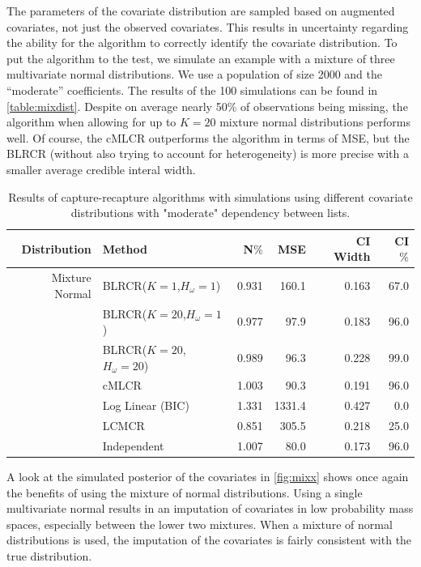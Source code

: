 \documentclass[
  12pt,
]{article}
\begin{document}
The parameters of the covariate distribution are sampled based on
augmented covariates, not just the observed covariates. This results in
uncertainty regarding the ability for the algorithm to correctly
identify the covariate distribution. To put the algorithm to the test,
we simulate an example with a mixture of three multivariate normal
distributions. We use a population of size 2000 and the ``moderate''
coefficients. The results of the 100 simulations can be found in
\autoref{table:mixdist}. Despite on average nearly 50\(\%\) of
observations being missing, the algorithm when allowing for up to
\(K=20\) mixture normal distributions performs well. Of course, the
cMLCR outperforms the algorithm in terms of MSE, but the BLRCR (without
also trying to account for heterogeneity) is more precise with a smaller
average credible interal width.

\begin{table}[H]
\centering
\begin{tabular}{||r l r r r r||} 
 \hline
Distribution & Method & N$\%$ &MSE & CI Width & CI $\%$   \\ [0.5ex] 
 \hline\hline
 Mixture Normal& BLRCR($K=1$,$H_\omega=1$)  & 0.931   & 160.1   & 0.163   & 67.0 \\ 
               & BLRCR($K=20$,$H_\omega=1$)    & 0.977     & 97.9     & 0.183     & 96.0 \\ 
               & BLRCR($K=20$,$H_\omega=20$)    & 0.989     & 96.3     & 0.228     & 99.0 \\  
               & cMLCR       & 1.003       & 90.3      & 0.191      & 96.0 \\
               & Log Linear (BIC)  & 1.331      & 1331.4     & 0.427     & 0.0 \\ 
               & LCMCR       & 0.851       & 305.5      & 0.218      & 25.0 \\ 
               & Independent & 1.007 & 80.0& 0.173& 96.0 \\ 

 \hline
\end{tabular}
\caption{Results of capture-recapture algorithms with simulations using different covariate distributions with "moderate" dependency between lists.}
\label{table:mixdist}
\end{table}

A look at the simulated posterior of the covariates in
\autoref{fig:mixx} shows once again the benefits of using the mixture of
normal distributions. Using a single multivariate normal results in an
imputation of covariates in low probability mass spaces, especially
between the lower two mixtures. When a mixture of normal distributions
is used, the imputation of the covariates is fairly consistent with the
true distribution.
\end{document}
